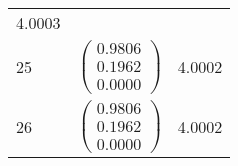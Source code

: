 \begin{longtable}{lll}
4.0003\\25 & $\begin{pmatrix} 0.9806\\0.1962\\0.0000\end{pmatrix}$ & 4.0002\\26 & $\begin{pmatrix} 0.9806\\0.1962\\0.0000\end{pmatrix}$ & 4.0002\\
\end{longtable}
